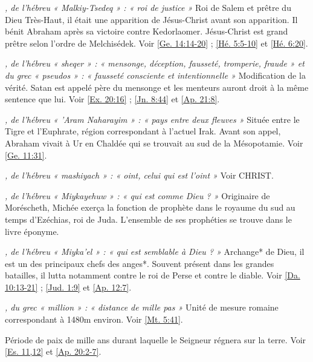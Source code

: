 \begin{multicols}{2}
\textit{, de l'hébreu « Malkiy-Tsedeq » : « roi de justice »}\newline
Roi de Salem et prêtre du Dieu Très-Haut, il était une apparition de Jésus-Christ avant son apparition. Il bénit Abraham après sa victoire contre Kedorlaomer. Jésus-Christ est grand prêtre selon l'ordre de Melchisédek. Voir \vref{Ge. 14:14-20} ; \vref{Hé. 5:5-10} et \vref{Hé. 6:20}.

\textit{, de l'hébreu « sheqer » : « mensonge, déception, fausseté, tromperie, fraude » et du grec « pseudos » : « fausseté consciente et intentionnelle »}\newline
Modification de la vérité. Satan est appelé père du mensonge et les menteurs auront droit à la même sentence que lui. Voir \vref{Ex. 20:16} ; \vref{Jn. 8:44} et \vref{Ap. 21:8}.

\textit{, de l'hébreu « 'Aram Naharayim » : « pays entre deux fleuves »}\newline
Située entre le Tigre et l'Euphrate, région correspondant à l'actuel Irak. Avant son appel, Abraham vivait à Ur en Chaldée qui se trouvait au sud de la Mésopotamie. Voir \vref{Ge. 11:31}.

\textit{, de l'hébreu « mashiyach » : « oint, celui qui est l'oint »}\newline
Voir CHRIST.

\textit{, de l'hébreu « Miykayehuw » : « qui est comme Dieu ? »}\newline
Originaire de Moréscheth, Michée exerça la fonction de prophète dans le royaume du sud au temps d'Ezéchias, roi de Juda. L'ensemble de ses prophéties se trouve dans le livre éponyme.

\textit{, de l'hébreu « Miyka'el » : « qui est semblable à Dieu ? »}\newline
Archange* de Dieu, il est un des principaux chefs des anges*. Souvent présent dans les grandes batailles, il lutta notamment contre le roi de Perse et contre le diable. Voir \vref{Da. 10:13-21} ; \vref{Jud. 1:9} et \vref{Ap. 12:7}.

\textit{, du grec « million » : « distance de mille pas »}\newline
Unité de mesure romaine correspondant à 1480m environ. Voir \vref{Mt. 5:41}.

\textit{}\newline
Période de paix de mille ans durant laquelle le Seigneur régnera sur la terre. Voir \vref{Es. 11,12} et \vref{Ap. 20:2-7}.


\end{multicols}

